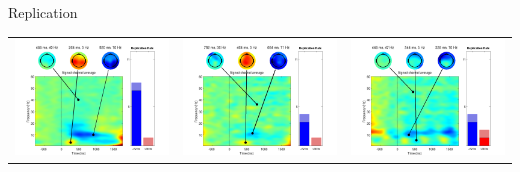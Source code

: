 \documentclass[final]{beamer}
\begin{document}
\begin{frame}{}
\begin{textblock}{70}
\begin{block}{Replication}
\begin{tabular}{c c c}
\includegraphics{gamma01} & \includegraphics{gamma02} & \includegraphics{gamma03} \\

\end{tabular}
\end{block}
\end{textblock}
\end{frame}
\end{document}
